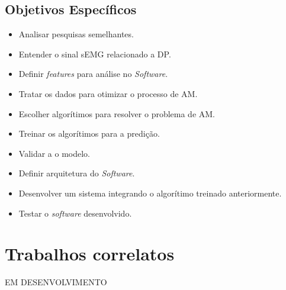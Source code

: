 \subsection{Objetivos Específicos}
\begin{itemize}
    \item Analisar pesquisas semelhantes.
    \item Entender o sinal sEMG relacionado a DP.
    \item Definir \textit{features} para análise no \textit{Software}.
    \item Tratar os dados para otimizar o processo de AM.
    \item Escolher algorítimos para resolver o problema de AM.
    \item Treinar os algorítimos para a predição.
    \item Validar a o modelo.
    \item Definir arquitetura do \textit{Software}.
    \item Desenvolver um sistema integrando o algorítimo treinado anteriormente.
    \item Testar o \textit{software} desenvolvido.
\end{itemize}
\section{Trabalhos correlatos}
EM DESENVOLVIMENTO